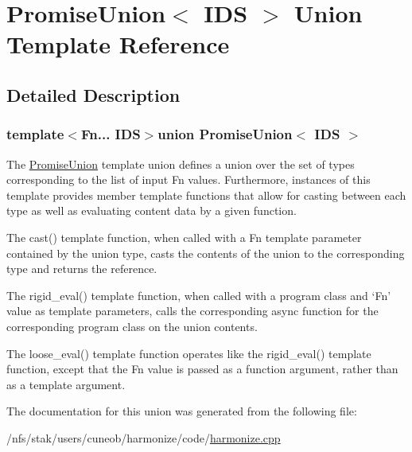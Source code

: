 \hypertarget{unionPromiseUnion}{\section{Promise\-Union$<$ I\-D\-S $>$ Union Template Reference}
\label{unionPromiseUnion}
}


\subsection{Detailed Description}
\subsubsection*{template$<$Fn... I\-D\-S$>$union Promise\-Union$<$ I\-D\-S $>$}

The {\ttfamily \hyperlink{unionPromiseUnion}{Promise\-Union}} template union defines a union over the set of types corresponding to the list of input {\ttfamily Fn} values. Furthermore, instances of this template provides member template functions that allow for casting between each type as well as evaluating content data by a given function.

The {\ttfamily cast()} template function, when called with a {\ttfamily Fn} template parameter contained by the union type, casts the contents of the union to the corresponding type and returns the reference.

The {\ttfamily rigid\-\_\-eval()} template function, when called with a program class and `\-Fn' value as template parameters, calls the corresponding async function for the corresponding program class on the union contents.

The {\ttfamily loose\-\_\-eval()} template function operates like the {\ttfamily rigid\-\_\-eval()} template function, except that the {\ttfamily Fn} value is passed as a function argument, rather than as a template argument. 

The documentation for this union was generated from the following file\-:\begin{DoxyCompactItemize}
\item 
/nfs/stak/users/cuneob/harmonize/code/\hyperlink{harmonize_8cpp}{harmonize.\-cpp}\end{DoxyCompactItemize}
